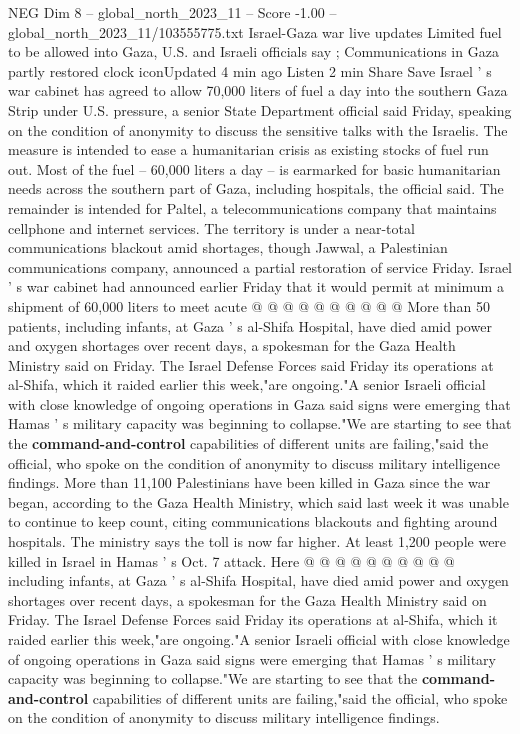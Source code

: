\begin{textsample}{NEG Dim 8 – global\_north\_2023\_11 – Score -1.00 – global\_north\_2023\_11/103555775.txt}  \label{ex:f8_neg_338}
Israel-Gaza war live updates Limited fuel to be allowed into Gaza, U.S. and Israeli officials say ; Communications in Gaza partly restored clock iconUpdated 4 min ago Listen 2 min Share Save Israel ' s war cabinet has agreed to allow 70,000 liters of fuel a day into the southern Gaza Strip under U.S. pressure, a senior State Department official said Friday, speaking on the condition of anonymity to discuss the sensitive talks with the Israelis.
The measure is intended to ease a humanitarian crisis as existing stocks of fuel run out.
Most of the fuel -- 60,000 liters a day -- is earmarked for basic humanitarian needs across the southern part of Gaza, including hospitals, the official said.
The remainder is intended for Paltel, a telecommunications company that maintains cellphone and internet services.
The territory is under a near-total communications blackout amid shortages, though Jawwal, a Palestinian communications company, announced a partial restoration of service Friday.
Israel ' s war cabinet had announced earlier Friday that it would permit at minimum a shipment of 60,000 liters to meet acute @ @ @ @ @ @ @ @ @ @ More than 50 patients, including infants, at Gaza ' s al-Shifa Hospital, have died amid power and oxygen shortages over recent days, a spokesman for the Gaza Health Ministry said on Friday.
The Israel Defense Forces said Friday its operations at al-Shifa, which it raided earlier this week,"are ongoing."A senior Israeli official with close knowledge of ongoing operations in Gaza said signs were emerging that Hamas ' s military capacity was beginning to collapse."We are starting to see that the \textbf{command-and-control} capabilities of different units are failing,"said the official, who spoke on the condition of anonymity to discuss military intelligence findings.
More than 11,100 Palestinians have been killed in Gaza since the war began, according to the Gaza Health Ministry, which said last week it was unable to continue to keep count, citing communications blackouts and fighting around hospitals.
The ministry says the toll is now far higher.
At least 1,200 people were killed in Israel in Hamas ' s Oct. 7 attack.
Here @ @ @ @ @ @ @ @ @ @ including infants, at Gaza ' s al-Shifa Hospital, have died amid power and oxygen shortages over recent days, a spokesman for the Gaza Health Ministry said on Friday.
The Israel Defense Forces said Friday its operations at al-Shifa, which it raided earlier this week,"are ongoing."A senior Israeli official with close knowledge of ongoing operations in Gaza said signs were emerging that Hamas ' s military capacity was beginning to collapse."We are starting to see that the \textbf{command-and-control} capabilities of different units are failing,"said the official, who spoke on the condition of anonymity to discuss military intelligence findings.

\end{textsample}
